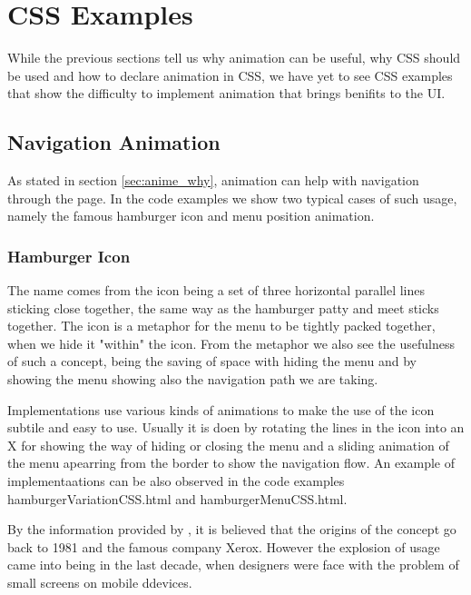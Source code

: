 

\section{CSS Examples} %
\label{sec:CSS_Examples}

While the previous sections tell us why animation can be useful, why CSS should be used and how to declare animation in CSS, we have yet to see CSS examples that show the difficulty to implement animation that brings benifits to the UI.

\subsection{Navigation Animation} %
\label{sub:navigationCSS}

As stated in section \ref{sec:anime_why}, animation can help with navigation through the page. In the code examples we show two typical cases of such usage, namely the famous hamburger icon and menu position animation.

\subsubsection{Hamburger Icon} %
\label{subsub:hamburger}

The name comes from the icon being a set of three horizontal parallel lines sticking close together, the same way as the hamburger patty and meet sticks together. The icon is a metaphor for the menu to be tightly packed together, when we hide it "within" the icon. From the metaphor we also see the usefulness of such a concept, being the saving of space with hiding the menu and by showing the menu showing also the navigation path we are taking.

Implementations use various kinds of animations to make the use of the icon subtile and easy to use. Usually it is doen by rotating the lines in the icon into an X for showing the way of hiding or closing the menu and a sliding animation of the menu apearring from the border to show the navigation flow. An example of implementaations can be also observed in the code examples hamburgerVariationCSS.html and hamburgerMenuCSS.html.

By the information provided by \citet{vtldesign}, it is believed that the origins of the concept go back to 1981 and the famous company Xerox. However the explosion of usage came into being in the last decade, when designers were face with the problem of small screens on mobile ddevices.

